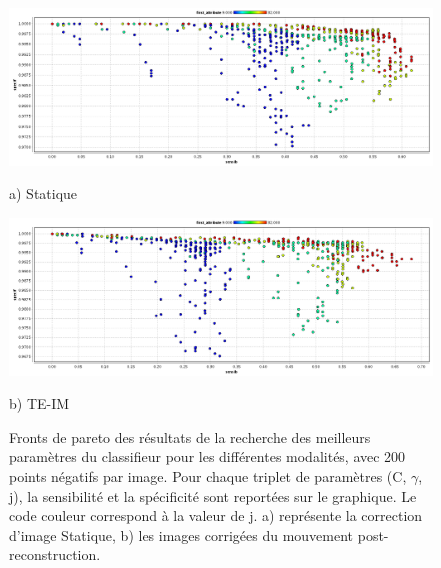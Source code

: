 \begin{figure}[h!]

\begin{center}
 \includegraphics[width=14cm]{images/pareto_mod_Static19.png}

{\small a) Statique}
\vspace{0.5cm}

 \includegraphics[width=14cm]{images/pareto_mod_IM19.png}

{\small b) TE-IM}

\end{center}
 \caption{Fronts de pareto des résultats de la recherche des meilleurs paramètres du classifieur pour les différentes modalités, avec 200 points négatifs par image. Pour chaque triplet de paramètres (C, $\gamma$, j), la sensibilité et la spécificité sont reportées sur le graphique. Le code couleur correspond à la valeur de j. a) représente la correction d'image Statique, b) les images corrigées du mouvement post-reconstruction.}
\label{fig:paretoModalite19_1}
\end{figure}

